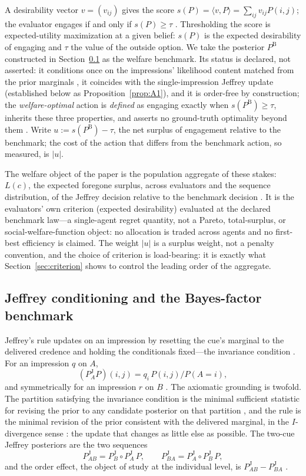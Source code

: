 \documentclass[review,12pt,authoryear]{elsarticle}
\theoremstyle{remark}
\theoremstyle{definition}
\newcommand{\PB}{P^{\mathrm{B}}}
\newcommand{\PJ}{P^{\mathrm{J}}}
\newcommand{\vv}{v}
\newcommand{\anchor}[1]{}
\begin{document}
A desirability vector $\vv=(v_{ij})$ gives the score
$s(P)=\langle\vv,P\rangle=\sum_{ij}v_{ij}P(i,j)$; the evaluator engages if and only if
$s(P)\ge\tau$ \anchor{Setup}. Thresholding the score is expected-utility maximization at a given
belief: $s(P)$ is the expected desirability of engaging and $\tau$ the value of the outside
option. We take the posterior $\PB$ constructed in Section~\ref{sec:jeffrey} as the welfare
benchmark. Its status is declared, not asserted: it conditions once on the impressions'
likelihood content matched from the prior marginals \citep{Wagner2002}, it coincides with the
single-impression Jeffrey update (established below as Proposition~\ref{prop:A1}), and it is order-free by
construction; the \emph{welfare-optimal} action is \emph{defined} as engaging exactly when
$s(\PB)\ge\tau$, inherits these three properties, and asserts no ground-truth optimality beyond
them \anchor{Setup}. Write $u:=s(\PB)-\tau$, the net surplus of engagement relative to the
benchmark; the cost of the action that differs from the benchmark action, so measured, is
$|u|$.

The welfare object of the paper is the population aggregate of these stakes:
$L(c)$, the expected foregone surplus, across evaluators and the sequence distribution, of the
Jeffrey decision relative to the benchmark decision \anchor{Thm.~B2}. It is the evaluators' own
criterion (expected desirability) evaluated at the declared benchmark law---a single-agent
regret quantity, not a Pareto, total-surplus, or social-welfare-function object: no allocation
is traded across agents and no first-best efficiency is claimed. The weight $|u|$ is a surplus
weight, not a penalty convention, and the choice of criterion is load-bearing: it is exactly
what Section~\ref{sec:criterion} shows to control the leading order of the aggregate.

\subsection{Jeffrey conditioning and the Bayes-factor benchmark}
\label{sec:jeffrey}

Jeffrey's rule updates on an impression by resetting the cue's marginal to the delivered
credence and holding the conditionals fixed---the invariance condition
\citep[ch.~11]{Jeffrey1983}. For an impression $q$ on $A$,
\[
  (\PJ_{A}P)(i,j)=q_{i}\,P(i,j)/P(A{=}i),
\]
and symmetrically for an impression $r$ on $B$ \anchor{Setup}. The axiomatic grounding is
twofold. The partition satisfying the invariance condition is the minimal sufficient statistic
for revising the prior to any candidate posterior on that partition
\citep[Thm.~2.2]{DiaconisZabell1982}, and the rule is the minimal revision of the prior
consistent with the delivered marginal, in the $I$-divergence sense
\citep[Thm.~5.1]{DiaconisZabell1982}: the update that changes as little else as possible. The
two-cue Jeffrey posteriors are the two sequences
\[
  \PJ_{AB}=\PJ_{B}\!\circ\PJ_{A}\,P,\qquad \PJ_{BA}=\PJ_{A}\!\circ\PJ_{B}\,P ,
\]
and the order effect, the object of study at the individual level, is
$\PJ_{AB}-\PJ_{BA}$ \anchor{Setup}.
\end{document}

